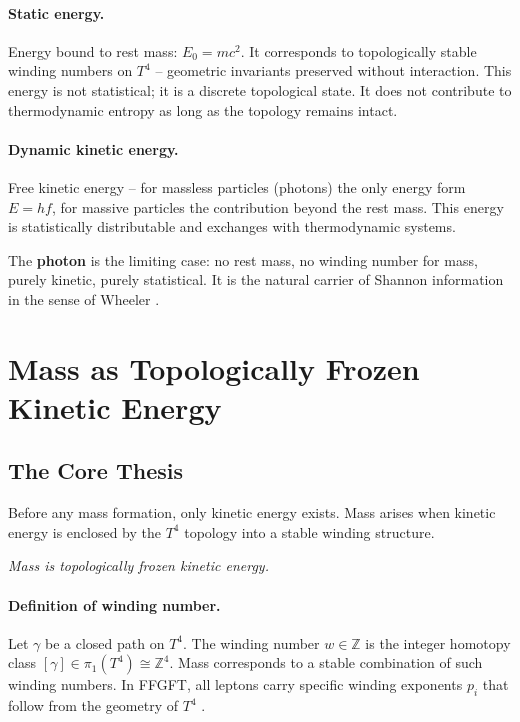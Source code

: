 \paragraph{Static energy.}
Energy bound to rest mass: \(E_0 = mc^2\).
It corresponds to topologically stable winding numbers on \(T^4\) --
geometric invariants preserved without interaction.
This energy is not statistical; it is a discrete topological state.
It does not contribute to thermodynamic entropy as long as the
topology remains intact.

\paragraph{Dynamic kinetic energy.}
Free kinetic energy -- for massless particles (photons) the only
energy form \(E = hf\), for massive particles the contribution
beyond the rest mass.
This energy is statistically distributable and exchanges
with thermodynamic systems.

The \textbf{photon} is the limiting case:
no rest mass, no winding number for mass, purely kinetic,
purely statistical. It is the natural carrier of Shannon information
in the sense of Wheeler \cite{Wheeler1990}.

\section{Mass as Topologically Frozen Kinetic Energy}

\subsection{The Core Thesis}

Before any mass formation, only kinetic energy exists.
Mass arises when kinetic energy is enclosed by the \(T^4\) topology
into a stable winding structure.

\begin{center}
\emph{Mass is topologically frozen kinetic energy.}
\end{center}

\paragraph{Definition of winding number.}
Let \(\gamma\) be a closed path on \(T^4\).
The winding number \(w \in \mathbb{Z}\) is the integer homotopy class
\([\gamma] \in \pi_1(T^4) \cong \mathbb{Z}^4\).
Mass corresponds to a stable combination of such winding numbers.
In FFGFT, all leptons carry specific winding exponents \(p_i\)
that follow from the geometry of \(T^4\) \cite{Pascher2026}.

